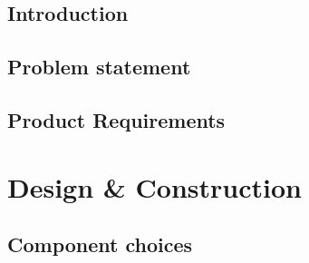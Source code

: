 \glsresetall
 \graphicspath{{figures/analysing/}}
\chapter{Introduction}
%
% 
% 
%
%
\chapter{Problem statement}

\chapter{Product Requirements}









\part{Design \& Construction}\label{pt:design} 
\graphicspath{{figures/design/}}
\chapter{Component choices}

%

%
%
%
%
%
